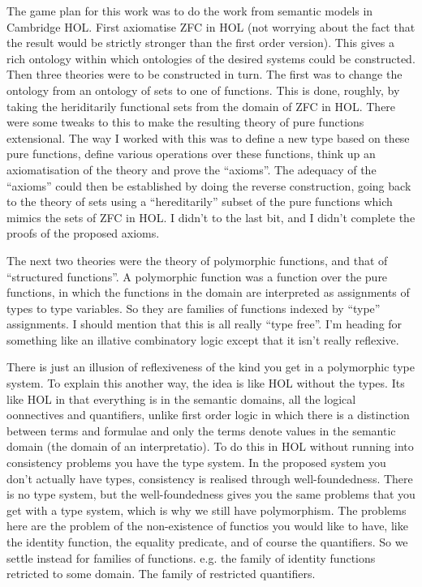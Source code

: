 \documentclass{rbjk}
\begin{document}
\begin{article}
The game plan for this work was to do the work from semantic models in Cambridge HOL.
First axiomatise ZFC in HOL (not worrying about the fact that the result would be strictly stronger than the first order version).
This gives a rich ontology within which ontologies of the desired systems could be constructed.
Then three theories were to be constructed in turn.
The first was to change the ontology from an ontology of sets to one of functions.
This is done, roughly, by taking the heriditarily functional sets from the domain of ZFC in HOL.
There were some tweaks to this to make the resulting theory of pure functions extensional.
The way I worked with this was to define a new type based on these pure functions, define various operations over these functions, think up an axiomatisation of the theory and prove the ``axioms''.
The adequacy of the ``axioms'' could then be established by doing the reverse construction, going back to the theory of sets using a ``hereditarily'' subset of the pure functions which mimics the sets of ZFC in HOL.
I didn't to the last bit, and I didn't complete the proofs of the proposed axioms.

The next two theories were the theory of polymorphic functions, and that of ``structured functions''.
A polymorphic function was a function over the pure functions, in which the functions in the domain are interpreted as assignments of types to type variables.
So they are families of functions indexed by ``type'' assignments.
I should mention that this is all really ``type free''.
I'm heading for something like an illative combinatory logic except that it isn't really reflexive.

There is just an illusion of reflexiveness of the kind you get in a polymorphic type system.
To explain this another way, the idea is like HOL without the types.
Its like HOL in that everything is in the semantic domains, all the logical oonnectives and quantifiers, unlike first order logic in which there is a distinction between terms and formulae and only the terms denote values in the semantic domain (the domain of an interpretatio).
To do this in HOL without running into consistency problems you have the type system.
In the proposed system you don't actually have types, consistency is realised through well-foundedness.
There is no type system, but the well-foundedness gives you the same problems that you get with a type system, which is why we still have polymorphism.
The problems here are the problem of the non-existence of functios you would like to have, like the identity function, the equality predicate, and of course the quantifiers.
So we settle instead for families of functions.
e.g. the family of identity functions retricted to some domain.
The family of restricted quantifiers.


\end{article}
\end{document}
